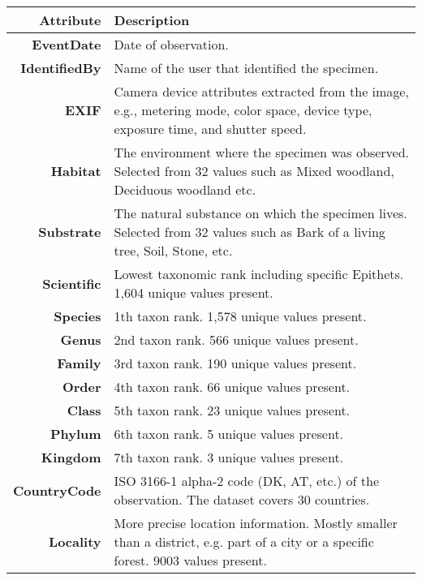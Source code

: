 \documentclass[10pt,twocolumn,letterpaper]{article}
\begin{document}
\begin{table}[tbh]
\begin{center}
\setlength{\tabcolsep}{0.28em} \renewcommand{\arraystretch}{1.2}
\begin{tabular}{| r  p{6.0cm}@{\hskip 5pt}  |}
    \hline
    \textbf{Attribute} & \textbf{Description} \\
    \hline
        \small{\textbf{EventDate}} & \small{Date of observation.} \\
        \small{\textbf{IdentifiedBy}} & \small{Name of the user that identified the specimen.} \\
        \small{\textbf{EXIF}} & \small{Camera device attributes extracted from the image, e.g., metering mode, color space, device type, exposure time, and shutter speed.} \\
        \hline
        \small{\textbf{Habitat}} & \small{The environment where the specimen was observed. Selected from 32 values such as Mixed woodland, Deciduous woodland etc.}\\
        \small{\textbf{Substrate}} & \small{The natural substance on which the specimen lives. Selected from 32 values such as Bark of a living tree, Soil, Stone,  etc.} \\\hline
        \small\textbf{{Scientific}} & \small{Lowest taxonomic rank including specific Epithets. 1,604 unique values present.} \\
        \small{\textbf{Species}} & \small1th taxon rank. 1,578 unique values present. \\ \small{\textbf{Genus}} & \small{2nd taxon rank. 566 unique values present.} \\
        \small{\textbf{Family}} & \small{3rd taxon rank. 190 unique values present.} \\
        \small{\textbf{Order}} & \small{4th taxon rank. 66 unique values present.} \\
        \small{\textbf{Class}} & \small{5th taxon rank. 23 unique values present.} \\
        \small{\textbf{Phylum}} & \small{6th taxon rank. 5 unique values present.} \\
        \small{\textbf{Kingdom}} & \small{7th taxon rank. 3 unique values present.} \\  
\hline
        \small{\textbf{CountryCode}} & \small{ISO 3166-1 alpha-2 code (DK, AT, etc.) of the observation. The dataset covers 30 countries.} \\ \small{\textbf{Locality}} & \small{More precise location information. Mostly smaller than a district, e.g. part of a city or a specific forest. 9003 values present.}  \\

\end{tabular}
\end{center}
\end{table}
\end{document}
